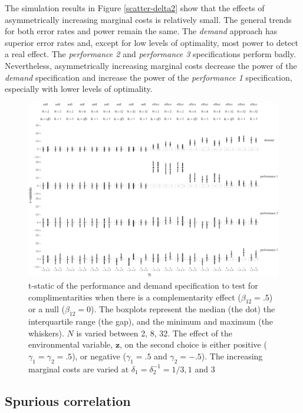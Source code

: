 \documentclass[12pt]{article}
\begin{document}
The simulation results in Figure \ref{scatter-delta2} show that the
effects of asymmetrically increasing marginal costs is relatively small.
The general trends for both error rates and power remain the same. The
\emph{demand} approach has superior error rates and, except for low
levels of optimality, most power to detect a real effect. The
\emph{performance 2} and \emph{performance 3} specifications perform
badly. Nevertheless, asymmetrically increasing marginal costs decrease
the power of the \emph{demand} specification and increase the power of
the \emph{performance 1} specification, especially with lower levels of
optimality.

\begin{figure}

\includegraphics[width=500px]{figure-latex/unnamed-chunk-10-1}
\caption[Error Rate and Power with Asymmetric with Marginal Costs]
{\label{delta2} t-static of the performance and demand specification to test
for complimentarities when there is a complementarity effect ($\beta_{12} = .5$)
or a null ($\beta_{12} = 0$). The boxplots represent the median (the dot) the
interquartile range (the gap), and the minimum and maximum (the whiskers). $N$
is varied between 2, 8, 32. The effect of the environmental
variable, $\mathbf{z}$, on the second choice is either positive
($\gamma_1 = \gamma_2 = .5$), or
negative ($\gamma_1 = .5$ and $\gamma_2 = -.5$). The increasing marginal costs
are varied at $\delta_1 = \delta_2^{-1} = 1/3, 1$ and $3$}
\end{figure}

\subsection{Spurious correlation}\label{spurious-correlation}
\end{document}
